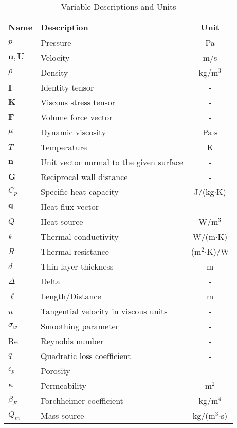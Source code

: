 \begin{table}[h]
\centering
\begin{tabularx}{\textwidth}{ABC}
\toprule
\textbf{Name} & \textbf{Description} & \textbf{Unit} \\ 
\midrule
\( p \) & Pressure & Pa \\ 
\( \mathbf{u}, \mathbf{U} \) & Velocity & m/s \\ 
\( \rho \) & Density & kg/m$^3$ \\ 
\( \mathbf{I} \) & Identity tensor & - \\ 
\( \mathbf{K} \) & Viscous stress tensor & - \\ 
\( \mathbf{F} \) & Volume force vector & - \\ 
\( \mu \) & Dynamic viscosity & Pa$\cdot$s \\ 
\( T \) & Temperature & K \\ 
\( \mathbf{n} \) & Unit vector normal to the given surface & - \\ 
\( \mathbf{G} \) & Reciprocal wall distance & - \\ 
\( C_p \) & Specific heat capacity & J/(kg$\cdot$K) \\ 
\( \mathbf{q} \) & Heat flux vector & - \\ 
\( Q \) & Heat source & W/m$^3$ \\ 
\( k \) & Thermal conductivity & W/(m$\cdot$K) \\ 
\( R \) & Thermal resistance & (m$^2$$\cdot$K)/W \\ 
\( d \) & Thin layer thickness & m \\ 
\( \Delta \) & Delta & - \\ 
\( \ell \) & Length/Distance & m \\ 
\( u^+ \) & Tangential velocity in viscous units & - \\ 
\( \sigma_w \) & Smoothing parameter & - \\ 
Re & Reynolds number & - \\ 
\( q \) & Quadratic loss coefficient & - \\ 
\( \epsilon_p \) & Porosity & - \\ 
\( \kappa \) & Permeability & m$^2$ \\ 
\( \beta_F \) & Forchheimer coefficient & kg/m$^4$ \\ 
\( Q_m \) & Mass source & kg/(m$^3$$\cdot$s) \\ 
\bottomrule
\end{tabularx}
\caption{Variable Descriptions and Units}
\label{tab:variables}
\end{table}

